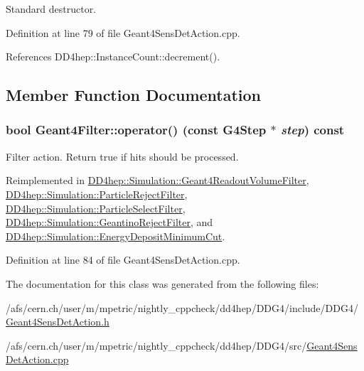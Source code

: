 Standard destructor. 

Definition at line 79 of file Geant4SensDetAction.cpp.

References DD4hep::InstanceCount::decrement().

\subsection{Member Function Documentation}
\hypertarget{class_d_d4hep_1_1_simulation_1_1_geant4_filter_afff6fafea1b7c0c7d61834ae0a51a23f}{
\subsubsection[{operator()}]{\setlength{\rightskip}{0pt plus 5cm}bool Geant4Filter::operator() (const G4Step $\ast$ {\em step}) const}}
\label{class_d_d4hep_1_1_simulation_1_1_geant4_filter_afff6fafea1b7c0c7d61834ae0a51a23f}


Filter action. Return true if hits should be processed. 

Reimplemented in \hyperlink{class_d_d4hep_1_1_simulation_1_1_geant4_readout_volume_filter_a95a43710204f164feed508114dffb548}{DD4hep::Simulation::Geant4ReadoutVolumeFilter}, \hyperlink{struct_d_d4hep_1_1_simulation_1_1_particle_reject_filter_a4fee0c9944f21ec58360f415427b601f}{DD4hep::Simulation::ParticleRejectFilter}, \hyperlink{struct_d_d4hep_1_1_simulation_1_1_particle_select_filter_a4d0d7fb1f0c8f552f5d8940405a3bbe2}{DD4hep::Simulation::ParticleSelectFilter}, \hyperlink{struct_d_d4hep_1_1_simulation_1_1_geantino_reject_filter_aa8d8f1469357f1ed18be0ed4ab7348b9}{DD4hep::Simulation::GeantinoRejectFilter}, and \hyperlink{struct_d_d4hep_1_1_simulation_1_1_energy_deposit_minimum_cut_a1ab9fdb187f848cbf70d15871188fe94}{DD4hep::Simulation::EnergyDepositMinimumCut}.

Definition at line 84 of file Geant4SensDetAction.cpp.

The documentation for this class was generated from the following files:\begin{DoxyCompactItemize}
\item 
/afs/cern.ch/user/m/mpetric/nightly\_\-cppcheck/dd4hep/DDG4/include/DDG4/\hyperlink{_geant4_sens_det_action_8h}{Geant4SensDetAction.h}\item 
/afs/cern.ch/user/m/mpetric/nightly\_\-cppcheck/dd4hep/DDG4/src/\hyperlink{_geant4_sens_det_action_8cpp}{Geant4SensDetAction.cpp}\end{DoxyCompactItemize}
